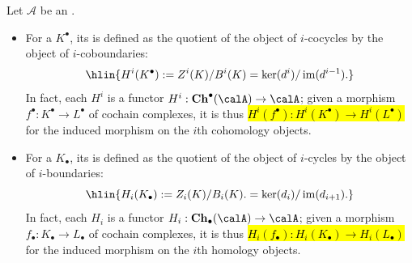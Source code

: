 \begin{definition} \label{definition:homology_and_cohomology_objects_for_a_chain_complex_in_an_additive_category}
    Let $\mathcal{A}$ be an .
    
    \begin{itemize}
        \item For a  $K^\bullet$, its  is defined as the quotient of the object of $i$-cocycles by the object of $i$-coboundaries:
        $$ \hlin{H^i(K^\bullet) := Z^i(K) / B^i(K) = \ker(d^i) / \operatorname{im}(d^{i-1}).} $$
        In fact, each $H^i$ is a functor $H^i: \mathbf{Ch}^\bullet(\calA) \to \calA$; given a morphism $f^\bullet: K^\bullet \to L^\bullet$ of cochain complexes, it is thus  \hl{$H^i(f^\bullet): H^i(K^\bullet) \to H^i(L^\bullet)$} for the induced morphism on the $i$th cohomology objects.

        \item For a  $K_\bullet$, its  is defined as the quotient of the object of $i$-cycles by the object of $i$-boundaries:
        $$ \hlin{H_i(K_\bullet) := Z_i(K) / B_i(K). = \ker(d_i) / \operatorname{im}(d_{i+1}).} $$
        In fact, each $H_i$ is a functor $H_i: \mathbf{Ch}_\bullet(\calA) \to \calA$; given a morphism $f_\bullet: K_\bullet \to L_\bullet$ of cochain complexes, it is thus  \hl{$H_i(f_\bullet): H_i(K_\bullet) \to H_i(L_\bullet)$} for the induced morphism on the $i$th homology objects.
    \end{itemize}
\end{definition}
